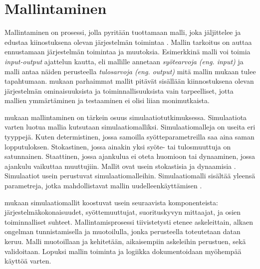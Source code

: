 \documentclass[utf8]{gradu3}
\begin{document}
\section{Mallintaminen} \label{mallintaminen}
\begin{comment}
Tämä alaluku on aika tiivistä. Sinänsä toki ok, mutta esim jo input-output ajattelu edellyttää, että on ensiksi tunnistettu paremmin järjestelmän/systeemin käsite, oliona, joka on tarkasteltavissa erillisenä muusta ympäristöstä ja jonka sidokset ympäristöön voidaan jakaa input ja output termeihin (eli input, kun ympäristö vaikuttaa systeemiin ja output, kun systeemi vaikuttaa (tai siitä näkyy) ympäristöön. Tämän päälle tulee sitten sen systeemin malli, jossa yleensä on mallin sisäisiä suureita, joita voi mahdollisesti vaihdella (sekä laadullisesti että määrällisesti).
\end{comment}
Mallintaminen on prosessi, jolla pyritään tuottamaan malli, joka jäljittelee 
ja edustaa kiinostuksena olevan järjestelmän toimintaa \parencite{maria1997introduction}. 
Mallin tarkoitus on auttaa ennustamaan järjestelmän toimintaa ja muutoksia.
Esimerkkinä malli voi toimia \textit{input-output} ajattelun kautta, 
eli mallille annetaan \textit{syötearvoja (eng. input)} ja malli antaa näiden perusteella
\textit{tulosarvoja (eng. output)} mitä mallin mukaan tulee tapahtumaan.
\textcite{maria1997introduction} mukaan parhaimmat mallit pitävät 
sisällään kiinnostuksena olevan järjestelmän 
ominaisuuksista ja toiminnallisuuksista vain tarpeelliset, 
jotta mallien ymmärtäminen ja testaaminen ei olisi liian monimutkaista.

\textcite{maria1997introduction} mukaan mallintaminen on tärkein osuus simulaatiotutkimuksessa.
Simulaatiota varten luotua mallia kutsutaan simulaatiomalliksi.
Simulaatiomalleja on useita eri tyyppejä. 
Kuten determistinen, jossa samoilla syötteparametreilla saa aina saman lopputuloksen. 
Stokastinen, jossa ainakin yksi syöte- tai tulosmuuttuja on satunnainen. 
Staattinen, jossa ajankulua ei oteta huomioon tai dynaaminen, 
jossa ajankulu vaikuttaa muuttujiin. Mallit ovat usein stokastisia ja dynaamisia \parencite{maria1997introduction}. 
Simulaatiot usein perustuvat simulaatiomalleihin. Simulaatiomalli sisältää yleensä parametreja,
jotka mahdollistavat mallin uudelleenkäyttämisen \parencite{introduction2005simulation}. 

\textcite{maria1997introduction} mukaan simulaatiomallit koostuvat usein seuraavista komponenteista: järjestelmäkokonaisuudet, syöttemuuttujat, suorituskyvyn mittaajat,
ja osien toiminnalliset suhteet. Mallintamisprosessi tiivistetysti etenee askeleittain, alkaen ongelman tunnistamisella ja muotoilulla, 
jonka perusteella toteutetaan datan keruu. Malli muotoillaan ja kehitetään, 
aikaisempiin askeleihin perustuen, sekä validoitaan. Lopuksi mallin toiminta ja logiikka dokumentoidaan myöhempää käyttöä varten.
\end{document}
